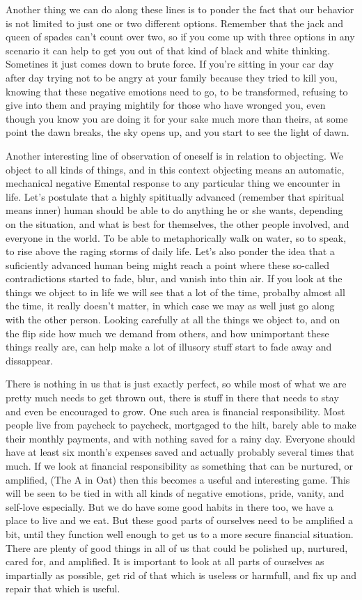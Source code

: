 \documentclass[12pt,letterpaper]{book}
\begin{document}
Another thing we can do along these lines is to ponder the fact that our behavior is not limited to just one or two different options. Remember that the jack and queen of spades can't count over two, so if you come up with three options in any scenario it can help to get you out of that kind of black and white thinking. Sometines it just comes down to brute force. If you're sitting in your car day after day trying not to be angry at your family because they tried to kill you, knowing that these negative emotions need to go, to be transformed, refusing to give into them and praying mightily for those who have wronged you, even though you know you are doing it for your sake much more than theirs, at some point the dawn breaks, the sky opens up, and you start to see the light of dawn.

Another interesting line of observation of oneself is in relation to objecting. We object to all kinds of things, and in this context objecting means an automatic, mechanical negative Emental response to any particular thing we encounter in life. Let's postulate that a highly spititually advanced (remember that spiritual means inner) human should be able to do anything he or she wants, depending on the situation, and what is best for themselves, the other people involved, and everyone in the world. To be able to metaphorically walk on water, so to speak, to rise above the raging storms of daily life. Let's also ponder the idea that a suficiently advanced human being might reach a point where these so-called contradictions started to fade, blur, and vanish into thin air. If you look at the things we object to in life we will see that a lot of the time, probalby almost all the time, it really doesn't matter, in which case we may as well just go along with the other person. Looking carefully at all the things we object to, and on the flip side how much we demand from others,  and how unimportant these things really are, can help make a lot of illusory stuff start to fade away and dissappear. 

There is nothing in us that is just exactly perfect, so while most of what we are pretty much needs to get thrown out, there is stuff in there that needs to stay and even be encouraged to grow. One such area is financial responsibility. Most people live from paycheck to paycheck, mortgaged to the hilt, barely able to make their monthly payments, and with nothing saved for a rainy day. Everyone should have at least six month's expenses saved and actually probably several times that much. If we look at financial responsibility as something that can be nurtured, or amplified, (The A in Oat) then this becomes a useful and interesting game. This will be seen to be tied in with all kinds of negative emotions, pride, vanity, and self-love especially. But we do have some good habits in there too, we have a place to live and we eat. But these good parts of ourselves need to be amplified a bit, until they function well enough to get us to a more secure financial situation. There are plenty of good things in all of us that could be polished up, nurtured, cared for, and amplified. It is important to look at all parts of ourselves as impartially as possible, get rid of that which is useless or harmfull, and fix up and repair that which is useful.
\end{document}
